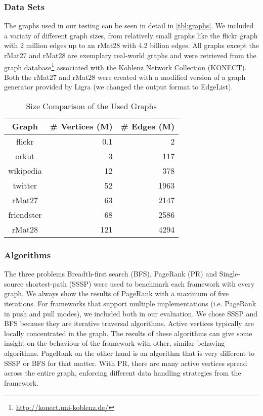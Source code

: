 \subsubsection{Data Sets}
The graphs used in our testing can be seen in detail in \autoref{tbl:graphs}. We included a variaty of different graph sizes, from relatively small graphs like the flickr graph with 2 million edges up to an rMat28 with 4.2 billion edges. All graphs except the rMat27 and rMat28 are exemplary real-world graphs and were retrieved from the graph database\footnote{\url{http://konect.uni-koblenz.de/}} associated with the Koblenz Network Collection (KONECT)\cite{konect}.
Both the rMat27 and rMat28 were created with a modified version of a graph generator provided by Ligra (we changed the output format to EdgeList).
\begin{table}
	\centering
	\caption{Size Comparison of the Used Graphs}
	\begin{tabular}{crr}
		\hline
		\bf{Graph}&\# Vertices (M)&\# Edges (M)\\\hline
		flickr&    		0.1&  2\\
		orkut&          3&    117\\
		wikipedia&      12&   378\\
		twitter&     	52&   1963\\
		rMat27&         63&   2147\\
		friendster&     68&   2586\\
		rMat28&         121&  4294\\
		\hline
	\end{tabular}
	\label{tbl:graphs}
\end{table}

\subsubsection{Algorithms}
The three problems Breadth-first search (BFS), PageRank (PR) and Single-source shortest-path (SSSP) were used to benchmark each framework with every graph.
We always show the results of PageRank with a maximum of five iterations.
For frameworks that support multiple implementations (i.e. PageRank in push and pull modes), we included both in our evaluation.
We chose SSSP and BFS because they are iterative traversal algorithms. Active vertices typically are locally concentrated in the graph. The results of these algorithms can give some insight on the behaviour of the framework with other, similar behaving algorithms.
PageRank on the other hand is an algorithm that is very different to SSSP or BFS for that matter. With PR, there are many active vertices spread across the entire graph, enforcing different data handling strategies from the framework.

